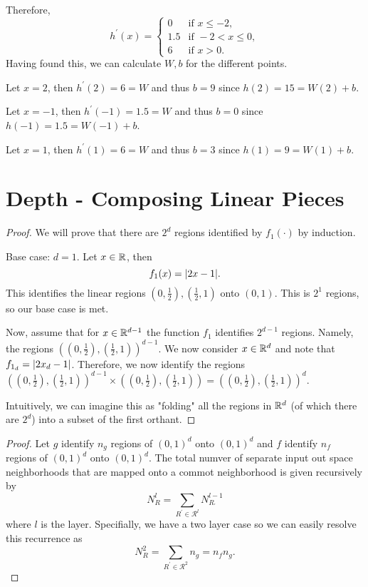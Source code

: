 \documentclass[twoside]{article}
\begin{document}
Therefore,
\begin{equation*}
	h^{\prime}(x) =
	\begin{cases}
		0   & \text{if } x \leq -2,     \\
		1.5 & \text{if } -2 < x \leq 0, \\
		6   & \text{if } x > 0.
	\end{cases}
\end{equation*}
Having found this, we can calculate $W, b$ for the different points.

Let $x = 2$, then $h^{\prime}(2) = 6 = W$ and thus $b = 9$ since $h(2) = 15 = W(2) + b$.

Let $x = -1$, then $h^{\prime}(-1) = 1.5 = W$ and thus $b = 0$ since $h(-1) = 1.5 = W(-1) + b$.

Let $x = 1$, then $h^{\prime}(1) = 6 = W$ and thus $b = 3$ since $h(1) = 9 = W(1) + b$.

\newpage
\section{Depth - Composing Linear Pieces}
\begin{proof}
	We will prove that there are $2^{d}$ regions identified by $f_{1}(\cdot)$ by induction.

	Base case: $d = 1$. Let $x \in \mathbb{R}$, then
	\begin{equation*}
		f_{1}(x) = \abs{2x - 1}.
	\end{equation*}
	This identifies the linear regions $(0, \frac{1}{2}), (\frac{1}{2}, 1)$ onto $(0, 1)$.
	This is $2^{1}$ regions, so our base case is met.

	Now, assume that for $x \in \mathbb{R}^{d - 1}$ the function $f_{1}$ identifies $2^{d - 1}$ regions.
	Namely, the regions $((0, \frac{1}{2}), (\frac{1}{2}, 1))^{d - 1}$.
	We now consider $x \in \mathbb{R}^{d}$ and note that $f_{1_{d}} = \abs{2x_{d} - 1}$.
	Therefore, we now identify the regions
	$((0, \frac{1}{2}), (\frac{1}{2}, 1))^{d - 1} \times ((0, \frac{1}{2}), (\frac{1}{2}, 1))
		= ((0, \frac{1}{2}), (\frac{1}{2}, 1))^{d}$.

	Intuitively, we can imagine this as "folding" all the regions in $\mathbb{R}^{d}$ (of which there
	are $2^{d}$) into a subset of the first orthant.
\end{proof}

\begin{proof}
	Let $g$ identify $n_{g}$ regions of $(0, 1)^{d}$ onto $(0, 1)^{d}$ and
	$f$ identify $n_{f}$ regions of $(0, 1)^{d}$ onto $(0, 1)^{d}$.
	The total numver of separate input out space neighborhoods that are mapped onto
	a commot neighborhood is given recursively by
	\begin{equation*}
		N_{R}^{l} = \sum_{R^{\prime} \in \mathcal{R}^{l}} N_{R_{\prime}}^{l - 1}
	\end{equation*}
	where $l$ is the layer. Specifially, we have a two layer case so we can easily
	resolve this recurrence as
	\begin{equation*}
		N_{R}^{2} = \sum_{R^{\prime} \in \mathcal{R}^{2}} n_{g} = n_{f}n_{g}.
	\end{equation*}
\end{proof}
\end{document}
